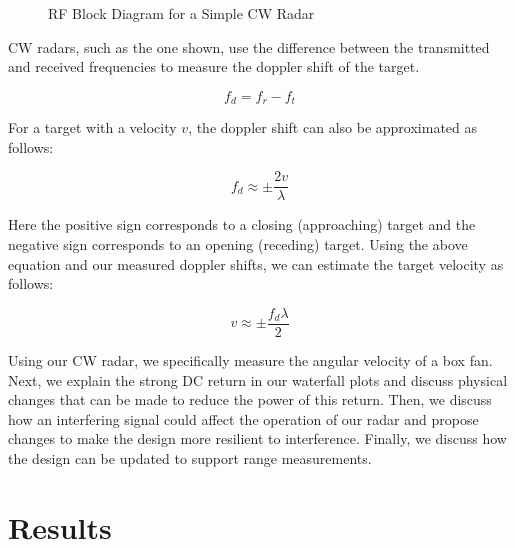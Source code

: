 \documentclass{article}
\begin{document}
\begin{figure}[H]
    	\centering
    	\caption{RF Block Diagram for a Simple CW Radar \cite{charvat_2011_build}}
    	\label{fig::cw_radar_block_diagram}
\end{figure}

\noindent CW radars, such as the one shown, use the difference between the transmitted and received frequencies to measure the doppler shift of the target.

\begin{equation*}
	f_d = f_r - f_t
\end{equation*}

\noindent For a target with a velocity $v$, the doppler shift can also be approximated as follows:

\begin{equation*}
	f_d \approx \pm\frac{2v}{\lambda}
\end{equation*}

\noindent Here the positive sign corresponds to a closing (approaching) target and the negative sign corresponds to an opening (receding) target. Using the above equation and our measured doppler shifts, we can estimate the target velocity as follows:

\begin{equation*}
	v \approx \pm\frac{f_d\lambda}{2}
\end{equation*}

\noindent Using our CW radar, we specifically measure the angular velocity of a box fan. Next, we explain the strong DC return in our waterfall plots and discuss physical changes that can be made to reduce the power of this return. Then, we discuss how an interfering signal could affect the operation of our radar and propose changes to make the design more resilient to interference. Finally, we discuss how the design can be updated to support range measurements.

\section{Results}
\end{document}
